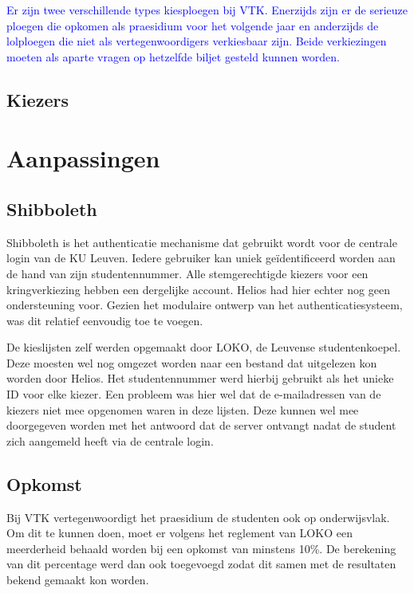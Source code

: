 \textcolor{blue}{Er zijn twee verschillende types kiesploegen bij VTK. Enerzijds zijn er de serieuze ploegen die opkomen als praesidium voor het volgende jaar en anderzijds de lolploegen die niet als vertegenwoordigers verkiesbaar zijn. Beide verkiezingen moeten als aparte vragen op hetzelfde biljet gesteld kunnen worden.}

\textcolor{blue}{}


\subsection{Kiezers}

\textcolor{red}{}

\section{Aanpassingen}
\label{sec:kv:aanpassingen}

\subsection{Shibboleth}

Shibboleth is het authenticatie mechanisme dat gebruikt wordt voor de centrale login van de KU Leuven. Iedere gebruiker kan uniek ge\"identificeerd worden aan de hand van zijn studentennummer. Alle stemgerechtigde kiezers voor een kringverkiezing hebben een dergelijke account. Helios had hier echter nog geen ondersteuning voor. Gezien het modulaire ontwerp van het authenticatiesysteem, was dit relatief eenvoudig toe te voegen.

\npar De kieslijsten zelf werden opgemaakt door LOKO, de Leuvense studentenkoepel. Deze moesten wel nog omgezet worden naar een bestand dat uitgelezen kon worden door Helios. Het studentennummer werd hierbij gebruikt als het unieke ID voor elke kiezer. Een probleem was hier wel dat de e-mailadressen van de kiezers niet mee opgenomen waren in deze lijsten. Deze kunnen wel mee doorgegeven worden met het antwoord dat de server ontvangt nadat de student zich aangemeld heeft via de centrale login.

\subsection{Opkomst}

Bij VTK vertegenwoordigt het praesidium de studenten ook op onderwijsvlak. Om dit te kunnen doen, moet er volgens het reglement van LOKO een meerderheid behaald worden bij een opkomst van minstens 10\%.\cite{loko_kiesreglement_verkiezingen} De berekening van dit percentage werd dan ook toegevoegd zodat dit samen met de resultaten bekend gemaakt kon worden.

